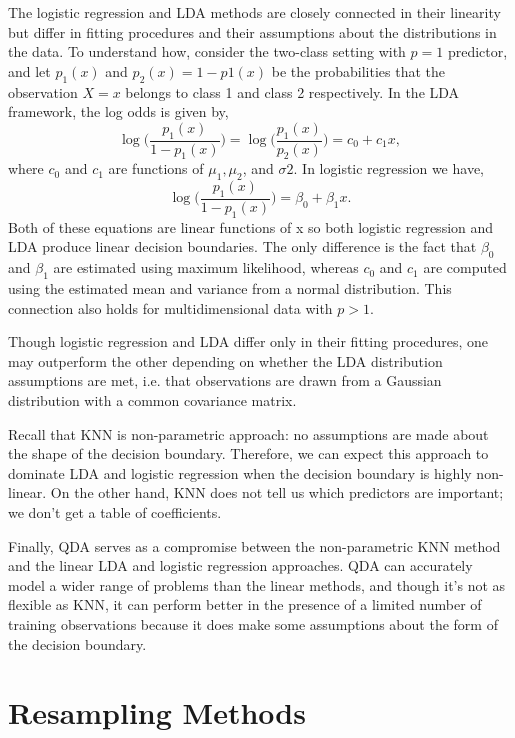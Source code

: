 \documentclass{article}
\numberwithin{equation}{section}
\begin{document}
\begin{enumerate}
The logistic regression and LDA methods are closely connected in their linearity but differ in fitting procedures and their assumptions about the distributions in the data. To understand how, consider the two-class setting with $p = 1$ predictor, and let $p_1(x)$ and $p_2(x)=1-p1(x)$ be the probabilities that the observation $X = x$ belongs to class 1 and class 2 respectively. In the LDA framework, the log odds is given by,
\begin{equation}
    \log \Bigg( \frac{p_1(x)}{1 -p_1(x)}\Bigg) = \log \Bigg( \frac{p_1(x)}{p_2(x)}\Bigg) = c_0 + c_1 x,
\end{equation}
where $c_0$ and $c_1$ are functions of $\mu_1, \mu_2$, and $\sigma2$. In logistic regression we have,
\begin{equation}
    \log \Bigg( \frac{p_1(x)}{1 -p_1(x)}\Bigg) = \beta_0 + \beta_1 x.
\end{equation}
Both of these equations are linear functions of x so both logistic regression and LDA produce linear decision boundaries. The only difference is the fact that $\beta_0$ and $\beta_1$ are estimated using maximum likelihood, whereas $c_0$ and $c_1$ are computed using the estimated mean and variance from a normal distribution. This connection also holds for multidimensional data with $p > 1$.

Though logistic regression and LDA differ only in their fitting procedures, one may outperform the other depending on whether the LDA distribution assumptions are met, i.e. that observations are drawn from a Gaussian distribution with a common covariance matrix.

Recall that KNN is non-parametric approach: no assumptions are made about the shape of the decision boundary. Therefore, we can expect this approach to dominate LDA and logistic regression when the decision boundary is highly non-linear.  On the other hand, KNN does not tell us which predictors are important; we don’t get a table of coefficients.

Finally, QDA serves as a compromise between the non-parametric KNN method and the linear LDA and logistic regression approaches. QDA can accurately model a wider range of problems than the linear methods, and though it's not as flexible as KNN, it can perform better in the presence of a limited number of training observations because it does make some assumptions about the form of the decision boundary.

\newpage
\section{Resampling Methods}


\end{enumerate}
\end{document}
